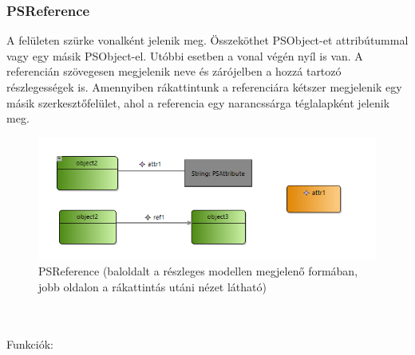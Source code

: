 \subsubsection{PSReference}
A felületen szürke vonalként jelenik meg. Összeköthet PSObject-et attribútummal vagy egy másik PSObject-el. Utóbbi esetben a vonal végén nyíl is van. A referencián szövegesen megjelenik neve és zárójelben a hozzá tartozó részlegességek is. Amennyiben rákattintunk a referenciára kétszer megjelenik egy másik szerkesztőfelület, ahol a referencia egy narancssárga téglalapként jelenik meg.
\begin{figure}[!ht]
	\centering
	\includegraphics{figures/ref.PNG}
	\caption{PSReference (baloldalt a részleges modellen megjelenő formában, jobb oldalon a rákattintás utáni nézet látható)}
	\label{ref} 
\end{figure}
\\\\
Funkciók:
